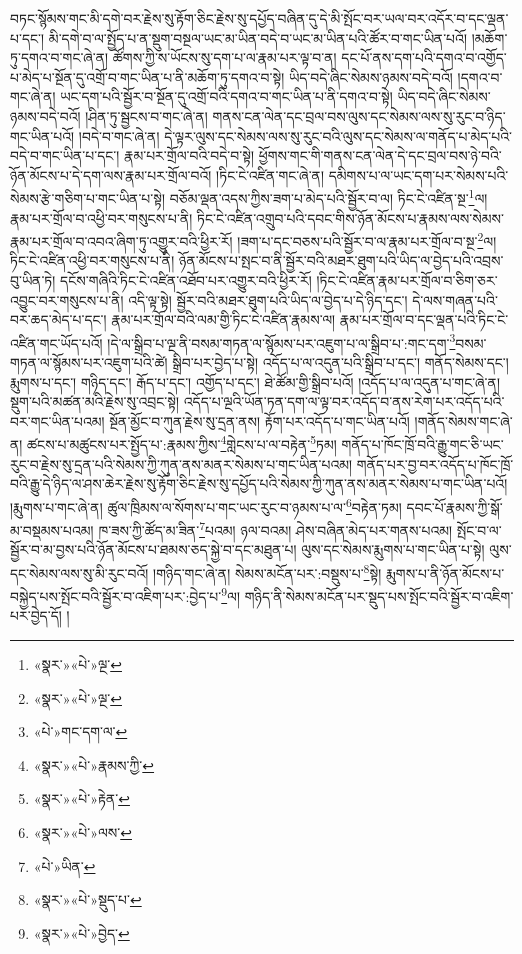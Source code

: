 བཏང་སྙོམས་གང་མི་དགེ་བར་རྗེས་སུ་རྟོག་ཅིང་རྗེས་སུ་དཔྱོད་བཞིན་དུ་དེ་མི་སྤོང་བར་ཡལ་བར་འདོར་བ་དང་ལྡན་པ་དང་། མི་དགེ་བ་ལ་སྤྱོད་པ་ན་སྡུག་བསྔལ་ཡང་མ་ཡིན་བདེ་བ་ཡང་མ་ཡིན་པའི་ཚོར་བ་གང་ཡིན་པའོ། །མཆོག་ཏུ་དགའ་བ་གང་ཞེ་ན། ཚོགས་ཀྱི་ས་ཡོངས་སུ་དག་པ་ལ་རྣམ་པར་ལྟ་བ་ན། དང་པོ་ནས་དག་པའི་དགའ་བ་འགྱོད་པ་མེད་པ་སྔོན་དུ་འགྲོ་བ་གང་ཡིན་པ་ནི་མཆོག་ཏུ་དགའ་བ་སྟེ། ཡིད་བདེ་ཞིང་སེམས་ཉམས་བདེ་བའོ། །དགའ་བ་གང་ཞེ་ན། ཡང་དག་པའི་སྦྱོར་བ་སྔོན་དུ་འགྲོ་བའི་དགའ་བ་གང་ཡིན་པ་ནི་དགའ་བ་སྟེ། ཡིད་བདེ་ཞིང་སེམས་ཉམས་བདེ་བའོ། །ཤིན་ཏུ་སྦྱངས་བ་གང་ཞེ་ན། གནས་ངན་ལེན་དང་བྲལ་བས་ལུས་དང་སེམས་ལས་སུ་རུང་བ་ཉིད་གང་ཡིན་པའོ། །བདེ་བ་གང་ཞེ་ན། དེ་ལྟར་ལུས་དང་སེམས་ལས་སུ་རུང་བའི་ལུས་དང་སེམས་ལ་གནོད་པ་མེད་པའི་བདེ་བ་གང་ཡིན་པ་དང་། རྣམ་པར་གྲོལ་བའི་བདེ་བ་སྟེ། ཕྱོགས་གང་གི་གནས་ངན་ལེན་དེ་དང་བྲལ་བས་ཉེ་བའི་ཉོན་མོངས་པ་དེ་དག་ལས་རྣམ་པར་གྲོལ་བའོ། །ཏིང་ངེ་འཛིན་གང་ཞེ་ན། དམིགས་པ་ལ་ཡང་དག་པར་སེམས་པའི་སེམས་རྩེ་གཅིག་པ་གང་ཡིན་པ་སྟེ། བཅོམ་ལྡན་འདས་ཀྱིས་ཟག་པ་མེད་པའི་སྦྱོར་བ་ལ། ཏིང་ངེ་འཛིན་སྔ་\footnote{«སྣར་»«པེ་»ལྔ་}ལ། རྣམ་པར་གྲོལ་བ་འཕྱི་བར་གསུངས་པ་ནི། ཏིང་ངེ་འཛིན་འགྲུབ་པའི་དབང་གིས་ཉོན་མོངས་པ་རྣམས་ལས་སེམས་རྣམ་པར་གྲོལ་བ་འབའ་ཞིག་ཏུ་འགྱུར་བའི་ཕྱིར་རོ། །ཟག་པ་དང་བཅས་པའི་སྦྱོར་བ་ལ་རྣམ་པར་གྲོལ་བ་སྔ་\footnote{«སྣར་»«པེ་»ལྔ་}ལ། ཏིང་ངེ་འཛིན་འཕྱི་བར་གསུངས་པ་ནི། ཉོན་མོངས་པ་སྤང་བ་ནི་སྦྱོར་བའི་མཐར་ཐུག་པའི་ཡིད་ལ་བྱེད་པའི་འབྲས་བུ་ཡིན་ཏེ། དངོས་གཞིའི་ཏིང་ངེ་འཛིན་འཐོབ་པར་འགྱུར་བའི་ཕྱིར་རོ། །ཏིང་ངེ་འཛིན་རྣམ་པར་གྲོལ་བ་ཅིག་ཅར་འབྱུང་བར་གསུངས་པ་ནི། འདི་ལྟ་སྟེ། སྦྱོར་བའི་མཐར་ཐུག་པའི་ཡིད་ལ་བྱེད་པ་དེ་ཉིད་དང་། དེ་ལས་གཞན་པའི་བར་ཆད་མེད་པ་དང་། རྣམ་པར་གྲོལ་བའི་ལམ་གྱི་ཏིང་ངེ་འཛིན་རྣམས་ལ། རྣམ་པར་གྲོལ་བ་དང་ལྡན་པའི་ཏིང་ངེ་འཛིན་གང་ཡོད་པའོ། །དེ་ལ་སྒྲིབ་པ་ལྔ་ནི་བསམ་གཏན་ལ་སྙོམས་པར་འཇུག་པ་ལ་སྒྲིབ་པ་:གང་དག་\footnote{«པེ་»གང་དག་ལ་}བསམ་གཏན་ལ་སྙོམས་པར་འཇུག་པའི་ཚེ། སྒྲིབ་པར་བྱེད་པ་སྟེ། འདོད་པ་ལ་འདུན་པའི་སྒྲིབ་པ་དང་། གནོད་སེམས་དང་། རྨུགས་པ་དང་། གཉིད་དང་། རྒོད་པ་དང་། འགྱོད་པ་དང་། ཐེ་ཚོམ་གྱི་སྒྲིབ་པའོ། །འདོད་པ་ལ་འདུན་པ་གང་ཞེ་ན། སྡུག་པའི་མཚན་མའི་རྗེས་སུ་འབྲང་སྟེ། འདོད་པ་ལྔའི་ཡོན་ཏན་དག་ལ་ལྟ་བར་འདོད་བ་ནས་རེག་པར་འདོད་པའི་བར་གང་ཡིན་པའམ། སྔོན་མྱོང་བ་ཀུན་རྗེས་སུ་དྲན་ནས། རྟོག་པར་འདོད་པ་གང་ཡིན་པའོ། །གནོད་སེམས་གང་ཞེ་ན། ཚངས་པ་མཚུངས་པར་སྤྱོད་པ་:རྣམས་ཀྱིས་\footnote{«སྣར་»«པེ་»རྣམས་ཀྱི་}གླེངས་པ་ལ་བརྟེན་\footnote{«སྣར་»«པེ་»རྟེན་}ཏམ། གནོད་པ་ཁོང་ཁྲོ་བའི་རྒྱུ་གང་ཅི་ཡང་རུང་བ་རྗེས་སུ་དྲན་པའི་སེམས་ཀྱི་ཀུན་ནས་མནར་སེམས་པ་གང་ཡིན་པའམ། གནོད་པར་བྱ་བར་འདོད་པ་ཁོང་ཁྲོ་བའི་རྒྱུ་དེ་ཉིད་ལ་ཤས་ཆེར་རྗེས་སུ་རྟོག་ཅིང་རྗེས་སུ་དཔྱོད་པའི་སེམས་ཀྱི་ཀུན་ནས་མནར་སེམས་པ་གང་ཡིན་པའོ། །རྨུགས་པ་གང་ཞེ་ན། ཚུལ་ཁྲིམས་ལ་སོགས་པ་གང་ཡང་རུང་བ་ཉམས་པ་ལ་\footnote{«སྣར་»«པེ་»ལས་}བརྟེན་ཏམ། དབང་པོ་རྣམས་ཀྱི་སྒོ་མ་བསྡམས་པའམ། ཁ་ཟས་ཀྱི་ཚོད་མ་ཟིན་\footnote{«པེ་»ཡིན་}པའམ། ཉལ་བའམ། ཤེས་བཞིན་མེད་པར་གནས་པའམ། སྤོང་བ་ལ་སྦྱོར་བ་མ་བྱས་པའི་ཉོན་མོངས་པ་ཐམས་ཅད་སྐྱེ་བ་དང་མཐུན་པ། ལུས་དང་སེམས་རྨུགས་པ་གང་ཡིན་པ་སྟེ། ལུས་དང་སེམས་ལས་སུ་མི་རུང་བའོ། །གཉིད་གང་ཞེ་ན། སེམས་མངོན་པར་:བསྡུས་པ་\footnote{«སྣར་»«པེ་»སྡུད་པ་}སྟེ། རྨུགས་པ་ནི་ཉོན་མོངས་པ་བསྐྱེད་པས་སྤོང་བའི་སྦྱོར་བ་འཇིག་པར་:བྱེད་པ་\footnote{«སྣར་»«པེ་»བྱེད་}ལ། གཉིད་ནི་སེམས་མངོན་པར་སྡུད་པས་སྤོང་བའི་སྦྱོར་བ་འཇིག་པར་བྱེད་དོ། །
